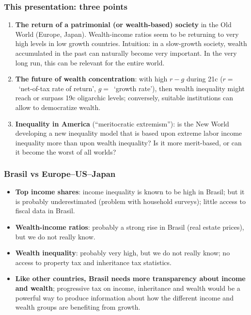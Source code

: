 \documentclass[t]{beamer}\usepackage[]{graphicx}\usepackage[]{color}
\begin{document}
\begin{frame}[label=ThreePoints,fragile,shrink=4]
\frametitle{This presentation: three points}
\begin{enumerate}
\item
\textbf{The return of a patrimonial (or wealth-based) society} in the Old World (Europe, Japan). Wealth-income ratios seem to be returning to very high levels in low growth countries.
\medskip\newline
Intuition: in a slow-growth society, wealth accumulated in the past can naturally become very important. In the very long run, this can be relevant for the entire world.
\item 
\textbf{The future of wealth concentration}: with high $r-g$ during 21c ($r =$~`net-of-tax rate of return', $g =$~`growth rate'), then wealth inequality might reach or surpass 19c oligarchic levels; conversely, suitable institutions can allow to democratize wealth.
\item
\textbf{Inequality in America} (``meritocratic extremism''): is the New World developing a new inequality model that is based upon extreme labor income inequality more than upon wealth inequality? Is it more merit-based, or can it become the worst of all worlds?
\end{enumerate}
\end{frame}


\begin{frame}[label=BrasilVersus]
\frametitle{Brasil vs Europe--US--Japan}
\begin{itemize}
\item
\textbf{Top income shares}: income inequality is known to be high in Brasil; but it is probably underestimated (problem with household surveys); little access to fiscal data in Brasil.
\item 
\textbf{Wealth-income ratios}: probably a strong rise in Brasil (real estate prices), but we do not really know.
\item
\textbf{Wealth inequality}: probably very high, but we do not really know; no access to property tax and inheritance tax statistics.
\item
\textbf{Like other countries, Brasil needs more transparency about income and wealth}; progressive tax on income, inheritance and wealth would be a powerful way to produce information about how the different income and wealth groups are benefiting from growth.
\end{itemize}
\end{frame}
\end{document}
